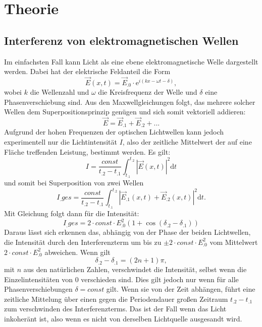 \section{Theorie}
\label{sec:Theorie}

\subsection{Interferenz von elektromagnetischen Wellen}
Im einfachsten Fall kann Licht als eine ebene elektromagnetische Welle dargestellt werden. Dabei hat der elektrische Feldanteil die Form
\begin{equation}
\vec{E}(x,t)=\vec{E}_.0\cdot \mathrm{e}^{i\left(kx -\omega t -\delta\right)}\label{eq:Welle},
\end{equation}
wobei $k$ die Wellenzahl und $\omega$ die Kreisfrequenz der Welle und $\delta$ eine Phasenverschiebung sind.
Aus den Maxwellgleichungen folgt, das mehrere solcher Wellen dem Superpositionsprinzip genügen und sich somit vektoriell addieren:
\[
\vec{E}=\vec{E}_.1+\vec{E}_.2+\text{...}
\]
Aufgrund der hohen Frequenzen der optischen Lichtwellen kann jedoch experimentell nur die Lichtintensität $I$, also der zeitliche Mittelwert der auf eine Fläche treffenden Leistung, bestimmt werden.
Es gilt:
\[
I=\frac{const}{t_.2-t_.1}\int_{t_.1}^{t_.2}|\vec{E}(x,t)|^2\mathrm{d}t
\]
und somit bei Superposition von zwei Wellen
\begin{equation}
I_.{ges}=\frac{const}{t_.2-t_.1}\int_{t_.1}^{t_.2}|\vec{E}_.1(x,t)+\vec{E}_.2(x,t)|^2\mathrm{d}t \text{.}
\end{equation}
Mit Gleichung folgt dann für die Intensität:
\begin{equation}
I_.{ges}=2\cdot const\cdot E^2_.0(1+\cos(\delta_.2-\delta_.1))
\end{equation}
Daraus lässt sich erkennen das, abhängig von der Phase der beiden Lichtwellen, die Intensität durch den Interferenzterm um bis zu $\pm 2\cdot const\cdot E^2_.0$ vom Mittelwert $2\cdot const\cdot E^2_.0$ abweichen.
Wenn gilt
\[
\delta_.2-\delta_.1=(2n+1)\pi,
\]
mit $n$ aus den natürlichen Zahlen, verschwindet die Intensität, selbst wenn die Einzelintensitäten von $0$ verschieden sind.
Dies gilt jedoch nur wenn für alle Phasenverschiebungen $\delta=const$ gilt. Wenn sie von der Zeit abhängen, führt eine zeitliche Mittelung über einen gegen die Periodendauer großen Zeitraum $t_.2-t_.1$ zum verschwinden des Interferenzterms. Das ist der Fall wenn das Licht inkoheränt ist, also wenn es nicht von derselben Lichtquelle ausgesandt wird.
